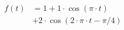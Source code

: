 \begin{center}
\begin{align*}
f(t) & = 1 + 1 \cdot \cos( \pi \cdot t ) \\
& + 2 \cdot \cos( 2 \cdot \pi \cdot t - \pi/4)
\end{align*}
\end{center}

